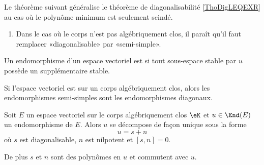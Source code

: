 Le théorème suivant généralise le théorème de diagonalisabilité \ref{ThoDigLEQEXR} au cas où le polynôme minimum est seulement scindé.

\begin{probleme}
    \begin{enumerate}
\item 
    Dans le cas où le corps n'est pas algébriquement clos, il paraît qu'il faut remplacer «diagonalisable» par «semi-simple».
    \end{enumerate}
\end{probleme}

\begin{definition}
    Un endomorphisme d'un espace vectoriel est  si tout sous-espace stable par \( u\) possède un supplémentaire stable.
\end{definition}
Si l'espace vectoriel est sur un corps algébriquement clos, alors les endomorphismes semi-simples sont les endomorphismes diagonaux.


\begin{theorem} \label{ThoRURcpW}
    Soit \( E\) un espace vectoriel sur le corps algébriquement clos \( \eK\) et \( u\in\End(E)\) un endomorphisme de \( E\). Alors \( u\) se décompose de façon unique sous la forme
    \begin{equation}
        u=s+n
    \end{equation}
    où \( s\) est diagonalisable, \( n\) est nilpotent et \( [s,n]=0\).

    De plus \( s\) et \( n\) sont des polynômes en \( u\) et commutent avec \( u\).
\end{theorem}

